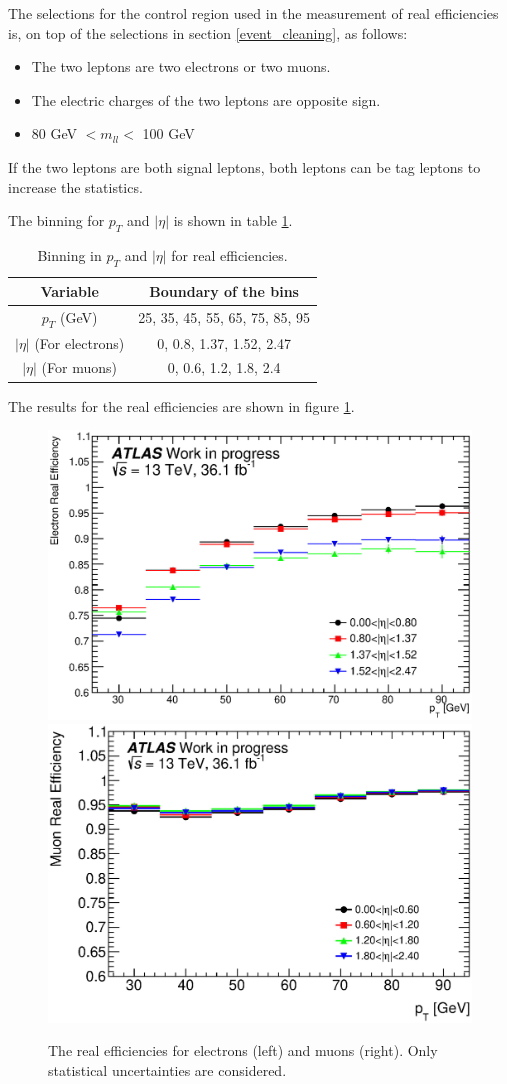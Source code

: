 The selections for the control region used in the measurement of real efficiencies is, on top of the selections in section \ref{event_cleaning}, as follows:
\begin{itemize}
\item The two leptons are two electrons or two muons.
\item The electric charges of the two leptons are opposite sign.
\item 80 GeV $< m_{ll} <$ 100 GeV
\end{itemize}

If the two leptons are both signal leptons, both leptons can be tag leptons to increase the statistics.

The binning for $p_T$ and $|\eta|$ is shown in table \ref{tab:binning_real_eff}.
\begin{table}[htbp]
\centering
\begin{tabular}{|c|c|}
\hline
Variable & Boundary of the bins \\
\hline
$p_T$ (GeV) &  25, 35, 45, 55, 65, 75, 85, 95 \\
\hline
$|\eta|$ (For electrons) & 0, 0.8, 1.37, 1.52, 2.47 \\
\hline
$|\eta|$ (For muons) & 0, 0.6, 1.2, 1.8, 2.4 \\
\hline
\end{tabular}
\caption{Binning in $p_T$ and $|\eta|$ for real efficiencies.}
\label{tab:binning_real_eff}
\end{table}

The results for the real efficiencies are shown in figure \ref{fig:result_real_eff}.
\begin{figure}[htpb]
\centering
\includegraphics[width=0.49\linewidth]{data/plot/plotRealEffs/El_hEff.eps}
\includegraphics[width=0.49\linewidth]{data/plot/plotRealEffs/Mu_hEff.eps}
\caption{The real efficiencies for electrons (left) and muons (right). Only statistical uncertainties are considered.}
\label{fig:result_real_eff}
\end{figure}

